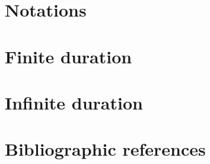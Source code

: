 \section{Notations}
\label{8-sec:notations}


\section{Finite duration}
\label{8-sec:finite_duration}


\section{Infinite duration}
\label{8-sec:infinite_duration}


\section*{Bibliographic references}
\label{8-sec:references}


